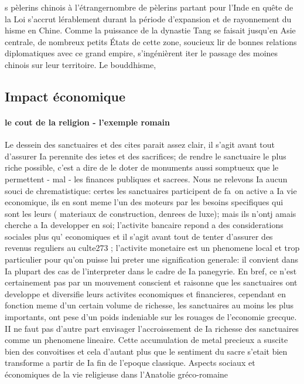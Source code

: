 s pèlerins chinois à l'étrangernombre de pèlerins partant pour l'Inde en quête de la Loi s'accrut lérablement durant la période d'expansion et de rayonnement du hisme en Chine. Comme la puissance de la dynastie Tang se faisait jusqu'en Asie centrale, de nombreux petits États de cette zone, soucieux lir de bonnes relations diplomatiques avec ce grand empire, s'ingénièrent iter le passage des moines chinois sur leur territoire. Le bouddhisme,
\cite[p. 233-239]{chen_histoire_2015}

\subsection{Impact économique}


\paragraph{le cout de la religion - l'exemple romain}
\begin{singlequote}
    Le dessein des sanctuaires et des cites parait assez clair, il s'agit
avant tout d'assurer Ia perennite des ietes et des sacrifices; de rendre
le sanctuaire le plus riche possible, c'est a dire de le doter de
monuments aussi somptueux que le permettent - mal - les finances
publiques et sacrees. Nous ne relevons Ia aucun souci de chrematistique:
certes les sanctuaires participent de fa~on active a Ia vie
economique, ils en sont meme l'un des moteurs par les besoins specifiques
qui sont les leurs ( materiaux de construction, denrees de
luxe); mais ils n'ontj amais cherche a Ia developper en soi; l'activite
bancaire repond a des considerations sociales plus qu' economiques
et il s'agit avant tout de tenter d'assurer des revenus reguliers au
culte273 ; l'activite monetaire est un phenomene local et trop particulier
pour qu'on puisse lui preter une signification generale: il
convient dans Ia plupart des cas de l'interpreter dans le cadre de Ia
panegyrie. En bref, ce n'est certainement pas par un mouvement
conscient et raisonne que les sanctuaires ont developpe et diversifie
leurs activites economiques et financieres, cependant en fonction
meme d'un certain volume de richesse, les sanctuaires au moins les
plus importants, ont pese d'un poids indeniable sur les rouages de
l'economie grecque. II ne faut pas d'autre part envisager l'accroissement
de Ia richesse des sanctuaires comme un phenomene
lineaire. Cette accumulation de metal precieux a suscite bien des
convoitises et cela d'autant plus que le sentiment du sacre s'etait
bien transforme a partir de Ia fin de l'epoque classique.
Aspects sociaux et économiques de la vie religieuse dans l'Anatolie gréco-romaine \cite{debord_aspects_1982}
\end{singlequote}
 

